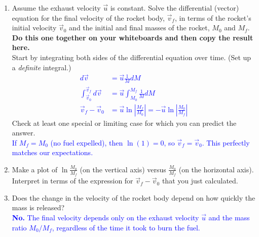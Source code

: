 \documentclass[11pt, letterpaper, openany]{book}
\newenvironment{exercise}[1][Exercise]{%
  \tcolorbox[blanker, breakable, left=1em,
    before skip=1em, after skip=1em,
    borderline west={3pt}{0pt}{PhysNavy},
    colback=PhysCream,
    before upper={\textcolor{PhysNavy}{\sffamily\bfseries #1:}\space}
  ]%
}{%
  \endtcolorbox%
}
\begin{document}
\begin{exercise}[Exercise 5]
\begin{enumerate}[label=(\alph*)]
    \item Assume the exhaust velocity $\vec{u}$ is constant. Solve the differential (vector) equation for the final velocity of the rocket body, $\vec{v}_f$, in terms of the rocket's initial velocity $\vec{v}_0$ and the initial and final masses of the rocket, $M_0$ and $M_f$. \\
    \textbf{Do this one together on your whiteboards and then copy the result here.} \\
    Start by integrating both sides of the differential equation over time. (Set up a \textit{definite} integral.) \\
    \textcolor{blue}{
    \begin{align*}
        d\vec{v} &= \vec{u} \frac{1}{M} dM \\
        \int_{\vec{v}_0}^{\vec{v}_f} d\vec{v} &= \vec{u} \int_{M_0}^{M_f} \frac{1}{M} dM \\
        \vec{v}_f - \vec{v}_0 &= \vec{u} \ln\left| \frac{M_f}{M_0} \right| = -\vec{u}\ln\left| \frac{M_0}{M_f} \right|
    \end{align*}
    }
    Check at least one special or limiting case for which you can predict the answer. \\
    \textcolor{blue}{If $M_f = M_0$ (no fuel expelled), then $\ln(1) = 0$, so $\vec{v}_f = \vec{v}_0$. This perfectly matches our expectations.}
    
    \item Make a plot of $\ln\frac{M_0}{M_f}$ (on the vertical axis) versus $\frac{M_0}{M_f}$ (on the horizontal axis). Interpret in terms of the expression for $\vec{v}_f - \vec{v}_0$ that you just calculated.
    \begin{center}
    \end{center}
    
    \item Does the change in the velocity of the rocket body depend on how quickly the mass is released? \\
    \textcolor{blue}{\textbf{No.} The final velocity depends only on the exhaust velocity $\vec{u}$ and the mass ratio $M_0/M_f$, regardless of the time it took to burn the fuel.}
    

\end{enumerate}
\end{exercise}
\end{document}
